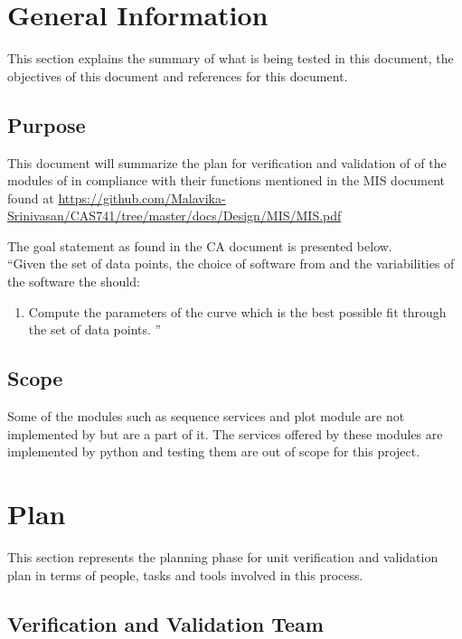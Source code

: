 \documentclass[12pt, titlepage]{article}
\begin{document}
\section{General Information}

This section explains the summary of what is being tested in this document, the 
objectives of this document and references for this document. 


\subsection{Purpose}

This document will summarize the plan for verification and validation of
of the modules of \famname{} in compliance with their functions mentioned in 
the MIS document found at 
\url{https://github.com/Malavika-Srinivasan/CAS741/tree/master/docs/Design/MIS/MIS.pdf}

The goal statement as found in the CA document is presented below.\\
\noindent ``Given the set of data points, the choice of software from 
\famname{} and the variabilities of the software the \famname{} should:

\begin{enumerate}
	
	\item Compute the parameters of the curve which is the best possible fit 
	through the set of data points.	''
\end{enumerate}


\subsection{Scope}

Some of the modules such as sequence services and plot module are not 
implemented by \famname{} but are a part of it. The services offered by these 
modules are implemented by python and testing them are out of scope for this 
project.

\section{Plan}

This section represents the planning phase for unit verification and validation 
plan in terms of people, tasks and tools involved in this process.
	
\subsection{Verification and Validation Team}
\end{document}
